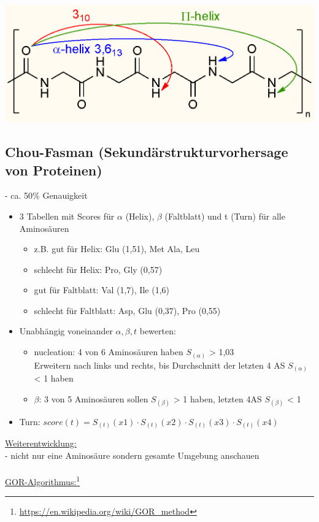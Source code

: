 \includegraphics[width=1\textwidth]{lectures/160530/pix/Hydrogen_bridging_in_proteins.jpg}

\subsection{Chou-Fasman (Sekundärstrukturvorhersage von Proteinen)}
 - ca. 50\% Genauigkeit
\begin{itemize}
	\item 3 Tabellen mit Scores für $\alpha$ (Helix), $\beta$ (Faltblatt) und t (Turn) für alle Aminosäuren
	\begin{itemize}
		\item z.B. gut für Helix: Glu (1,51), Met Ala, Leu
		\item schlecht für Helix: Pro, Gly (0,57)
		\item gut für Faltblatt: Val (1,7), Ile (1,6)
		\item schlecht für Faltblatt: Asp, Glu (0,37), Pro (0,55)
	\end{itemize}
	\item Unabhängig voneinander $\alpha, \beta, t$ bewerten:
	\begin{itemize}
		\item nucleation: 4 von 6 Aminosäuren haben $S_{(\alpha)}$ > 1,03\\
		Erweitern nach links und rechts, bis Durchschnitt der letzten 4 AS $S_{(\alpha)}$ < 1 haben
		\item $\beta$: 3 von 5 Aminosäuren sollen $S_{(\beta)}$ > 1 haben, letzten 4AS $S_{(\beta)}$ < 1
	\end{itemize}
		\item Turn: $score(t)=S_{(t)}(x1) \cdot S_{(t)}(x2) \cdot S_{(t)}(x3) \cdot S_{(t)}(x4)$
\end{itemize}

\underline{Weiterentwicklung:}\\
 - nicht nur eine Aminosäure sondern gesamte Umgebung anschauen\\\\
\underline{GOR-Algorithmus:}\footnote{\url{https://en.wikipedia.org/wiki/GOR_method}}\\

